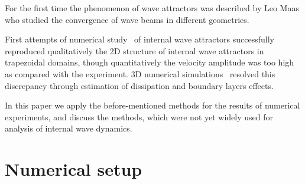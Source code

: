 \documentclass[a4wide,fontsize=12pt]{article}
\begin{document}

For the first time the phenomenon of wave attractors was described by Leo Maas \cite{Maas1995,1997MaasBenielliSommeriaLam} who studied the convergence of wave beams in different geometries.

First attempts of numerical study~\cite{2008GrisouardStaquetPairaud} of internal wave attractors successfully reproduced qualitatively the 2D structure of internal wave attractors in trapezoidal domains, though quantitatively the velocity amplitude was too high  as compared with the experiment. 3D numerical simulations~\cite{2016BrouzetSibgatullinScolanErmanyukDauxois,2016BrouzetErmanyukJoubaudSibgatullinDauxois} resolved this discrepancy through estimation of dissipation and boundary layers effects.

In this paper we apply the before-mentioned methods for the results of numerical experiments, and discuss the methods, which were not yet widely used for analysis of internal wave dynamics.

\section{Numerical setup}
\end{document}
